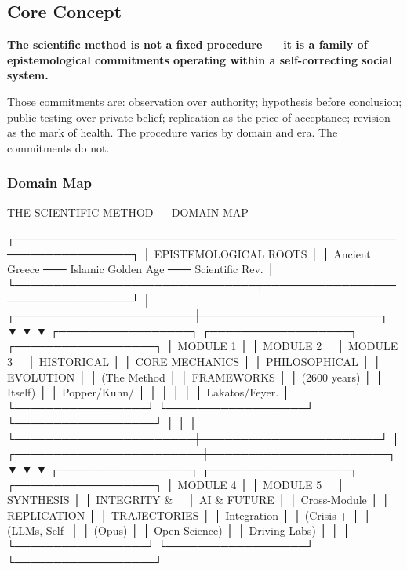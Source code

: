 \documentclass[11pt,letterpaper]{article}
\begin{document}
\subsection{Core Concept}

\textbf{The scientific method is not a fixed procedure --- it is a family of epistemological commitments operating within a self-correcting social system.}

Those commitments are: observation over authority; hypothesis before conclusion; public testing over private belief; replication as the price of acceptance; revision as the mark of health. The procedure varies by domain and era. The commitments do not.

\subsubsection{Domain Map}

\begin{asciibox}
                    THE SCIENTIFIC METHOD — DOMAIN MAP

  ┌─────────────────────────────────────────────────────────────────┐
  │                      EPISTEMOLOGICAL ROOTS                      │
  │   Ancient Greece ─── Islamic Golden Age ─── Scientific Rev.    │
  └───────────────────────────────┬─────────────────────────────────┘
                                  │
           ┌───────────────────────┼───────────────────────┐
           ▼                       ▼                       ▼
  ┌─────────────────┐   ┌──────────────────┐   ┌──────────────────┐
  │   MODULE 1      │   │   MODULE 2       │   │   MODULE 3       │
  │  HISTORICAL     │   │  CORE MECHANICS  │   │  PHILOSOPHICAL   │
  │  EVOLUTION      │   │  (The Method     │   │  FRAMEWORKS      │
  │  (2600 years)   │   │   Itself)        │   │  Popper/Kuhn/    │
  │                 │   │                  │   │  Lakatos/Feyer.  │
  └─────────────────┘   └──────────────────┘   └──────────────────┘
           │                       │                       │
           └───────────────────────┼───────────────────────┘
                                   │
           ┌────────────────────────┼───────────────────────┐
           ▼                        ▼                       ▼
  ┌─────────────────┐    ┌──────────────────┐   ┌──────────────────┐
  │   MODULE 4      │    │   MODULE 5       │   │   SYNTHESIS      │
  │  INTEGRITY &    │    │  AI & FUTURE     │   │  Cross-Module    │
  │  REPLICATION    │    │  TRAJECTORIES    │   │  Integration     │
  │  (Crisis +      │    │  (LLMs, Self-    │   │  (Opus)          │
  │   Open Science) │    │   Driving Labs)  │   │                  │
  └─────────────────┘    └──────────────────┘   └──────────────────┘
\end{asciibox}
\end{document}
